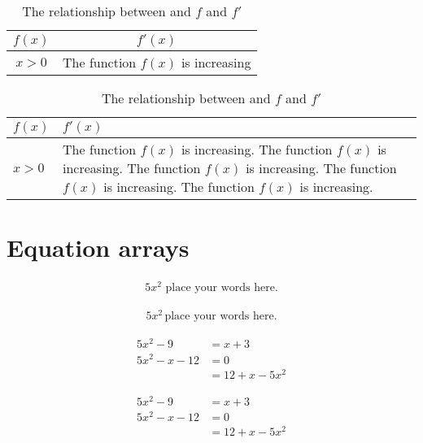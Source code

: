 \documentclass[11pt]{article}
\begin{document}
\begin{table} [H]
\def\arraystretch {1.5}
\centering

\caption{The relationship between and $f$ and $f'$}
\begin{tabular}{|c|c|}
\hline
$f(x)$ & $f'(x)$ \\ \hline 
$ x >0 $  & The function $ f(x) $ is increasing \\ \hline
\end{tabular}

\end{table}





\begin{table} [H]
\def\arraystretch {1.5}
\centering

\caption{The relationship between and $f$ and $f'$}
\begin{tabular}{|l|p{12cm}|}
\hline
$f(x)$ & $f'(x)$ \\ \hline 
$ x >0 $  & The function $ f(x) $ is increasing. The function $ f(x) $ is increasing. The function $ f(x) $ is increasing. The function $ f(x) $ is increasing. The function $ f(x) $ is increasing.  \\ \hline
\end{tabular}

\end{table}


\section{Equation arrays}

\begin{align}
5                    x^2 \text{ place your words here.}
\end{align}

\begin{align}
5                    x^2      \,     \text{place your words here.}
\end{align}


\begin{align*}
5x^2-9     &=    x+3 \\
5x^2 -x -12    &=    0 \\
&= 12+x -5x^2
\end{align*}


\begin{align}
5x^2-9     &=    x+3 \\
5x^2 -x -12    &=    0 \\
&= 12+x -5x^2
\end{align}
\end{document}
